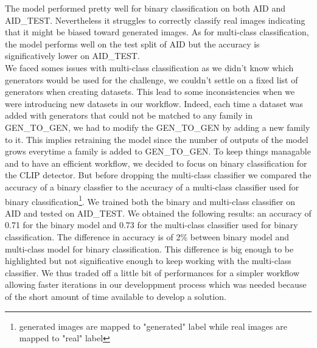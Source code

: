 \documentclass[12pt,a4paper]{article}
\begin{document}
The model performed pretty well for binary classification on both AID and AID\_TEST. Nevertheless it struggles to correctly classify real images indicating that it might be biased toward generated images. As for multi-class classification, the model performs well on the test split of AID but the accuracy is significatively lower on AID\_TEST.\\


We faced somes issues with multi-class classification as we didn't know which generators would be used for the challenge, we couldn't settle on a fixed list of generators when creating datasets. This lead to some inconsistencies when we were introducing new datasets in our workflow. Indeed, each time a dataset was added with generators that could not be matched to any family in GEN\_TO\_GEN, we had to modify the GEN\_TO\_GEN by adding a new family to it. This implies retraining the model since the number of outputs of the model grows everytime a family is added to GEN\_TO\_GEN. To keep things managable and to have an efficient workflow, we decided to focus on binary classification for the CLIP detector. But before dropping the multi-class classifier we compared the accuracy of a binary classfier to the accuracy of a multi-class classifier used for binary classification\footnote{generated images are mapped to "generated" label while real images are mapped to "real" label}. We trained both the binary and multi-class classifier on AID and tested on AID\_TEST. We obtained the following results: an accuracy of 0.71 for the binary model and 0.73 for the multi-class classifier used for binary classification. The difference in accuracy is of 2\% between binary model and multi-class model for binary classification. This difference is big enough to be highlighted but not significative enough to keep working with the multi-class classifier. We thus traded off a little bit of performances for a simpler workflow allowing faster iterations in our developpment process which was needed because of the short amount of time available to develop a solution.\\
\end{document}
